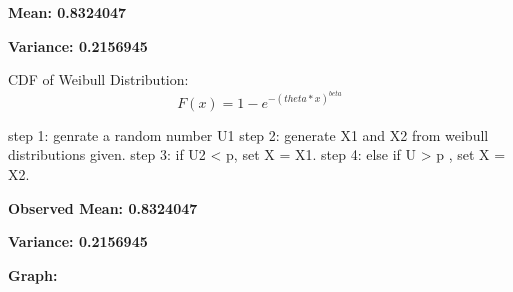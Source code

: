 \documentclass[11pt]{article}
\begin{document}

\textbf{Mean: 0.8324047}\

\textbf{Variance: 0.2156945 }\

	CDF of Weibull Distribution:\
	\begin{equation}
	F(x)= 1-e^{-(theta*x)^{beta}}
	\end{equation}

step 1: genrate a random number U1
step 2: generate X1 and X2 from weibull distributions given.
step 3: if U2 < p, set X = X1.
step 4: else if U > p , set X = X2.


	\textbf{Observed Mean: 0.8324047}\

	\textbf{Variance: 0.2156945}\

	\textbf{Graph: }\


\begin{figure}[H]
  \centering
 \\
\end{figure}
\end{document}
